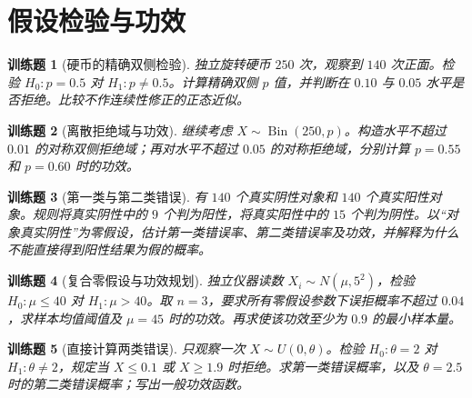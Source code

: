 \documentclass[UTF8,12pt,a4paper,fontset=fandol]{ctexbook}
\newtheorem{exercise}{训练题}[section]
\begin{document}
\clearpage\section{假设检验与功效}

\begin{exercise}[硬币的精确双侧检验]\label{q:M-P8-1ab}
独立旋转硬币 $250$ 次，观察到 $140$ 次正面。检验 $H_0:p=0.5$ 对 $H_1:p\ne0.5$。计算精确双侧 $p$ 值，并判断在 $0.10$ 与 $0.05$ 水平是否拒绝。比较不作连续性修正的正态近似。\par{}\end{exercise}

\begin{exercise}[离散拒绝域与功效]\label{q:M-P8-1cd}
继续考虑 $X\sim\operatorname{Bin}(250,p)$。构造水平不超过 $0.01$ 的对称双侧拒绝域；再对水平不超过 $0.05$ 的对称拒绝域，分别计算 $p=0.55$ 和 $p=0.60$ 时的功效。\par{}\end{exercise}

\begin{exercise}[第一类与第二类错误]\label{q:M-P8-2}
有 $140$ 个真实阴性对象和 $140$ 个真实阳性对象。规则将真实阴性中的 $9$ 个判为阳性，将真实阳性中的 $15$ 个判为阴性。以“对象真实阴性”为零假设，估计第一类错误率、第二类错误率及功效，并解释为什么不能直接得到阳性结果为假的概率。\par{}\end{exercise}

\begin{exercise}[复合零假设与功效规划]\label{q:M-P8-3}
独立仪器读数 $X_i\sim N(\mu,5^2)$，检验 $H_0:\mu\le40$ 对 $H_1:\mu>40$。取 $n=3$，要求所有零假设参数下误拒概率不超过 $0.04$，求样本均值阈值及 $\mu=45$ 时的功效。再求使该功效至少为 $0.9$ 的最小样本量。\par{}\end{exercise}

\begin{exercise}[直接计算两类错误]\label{q:M-P8-4}
只观察一次 $X\sim U(0,\theta)$。检验 $H_0:\theta=2$ 对 $H_1:\theta\ne2$，规定当 $X\le0.1$ 或 $X\ge1.9$ 时拒绝。求第一类错误概率，以及 $\theta=2.5$ 时的第二类错误概率；写出一般功效函数。\par{}\end{exercise}
\end{document}
